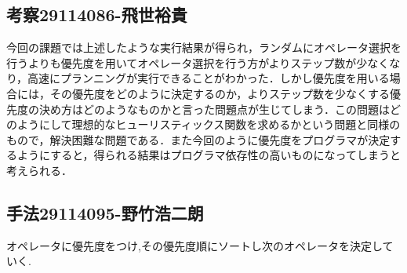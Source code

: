 \documentclass{jarticle}
\begin{document}
\subsection{考察29114086-飛世裕貴}
今回の課題では上述したような実行結果が得られ，ランダムにオペレータ選択を行うよりも優先度を用いてオペレータ選択を行う方がよりステップ数が少なくなり，高速にプランニングが実行できることがわかった．しかし優先度を用いる場合には，その優先度をどのように決定するのか，よりステップ数を少なくする優先度の決め方はどのようなものかと言った問題点が生じてしまう．この問題はどのようにして理想的なヒューリスティックス関数を求めるかという問題と同様のもので，解決困難な問題である．また今回のように優先度をプログラマが決定するようにすると，得られる結果はプログラマ依存性の高いものになってしまうと考えられる．

\subsection{手法29114095-野竹浩二朗}
オペレータに優先度をつけ,その優先度順にソートし次のオペレータを決定していく.
\end{document}
